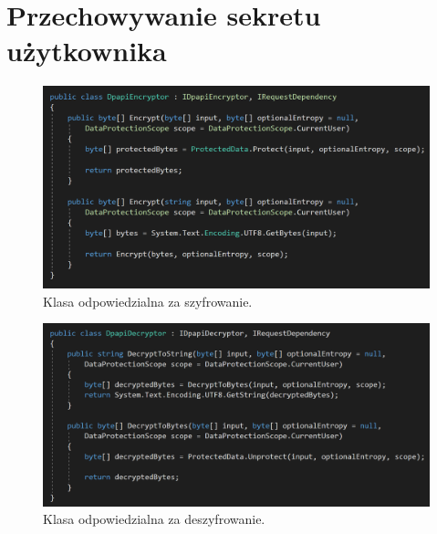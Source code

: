 \section{Przechowywanie sekretu użytkownika}
\begin{figure}[t]
    \centering
	\includegraphics[width=\textwidth]{content/images/code-encrypt}
    \caption{Klasa odpowiedzialna za szyfrowanie.}
    \label{code-encrypt}
\end{figure}
\begin{figure}[t]
    \centering
	\includegraphics[width=\textwidth]{content/images/code-decrypt}
    \caption{Klasa odpowiedzialna za deszyfrowanie.}
    \label{code-decrypt}
\end{figure}

